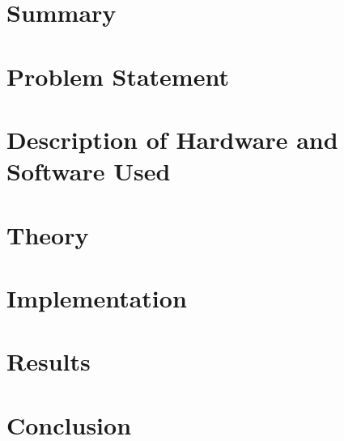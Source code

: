 \documentclass[12pt, twoside,a4paper]{report}
\begin{document}
\chapter{Summary}


\chapter{Problem Statement}
 

\chapter{Description of Hardware and Software Used}


\chapter*{Theory}


\chapter{Implementation}


\chapter{Results}


\chapter{Conclusion}


%


\end{document}
